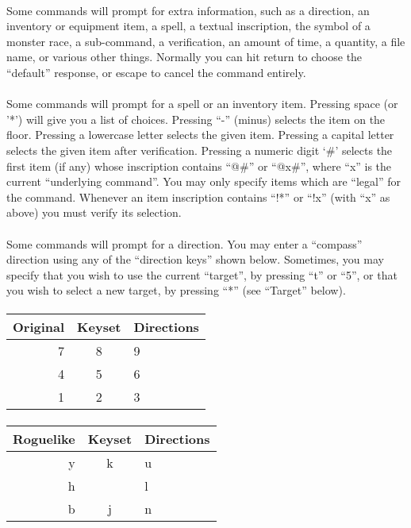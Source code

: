 \paragraph{}Some commands will prompt for extra information, such as a direction, an
inventory or equipment item, a spell, a textual inscription, the symbol of a
monster race, a sub-command, a verification, an amount of time, a quantity,
a file name, or various other things. Normally you can hit return to choose
the ``default'' response, or escape to cancel the command entirely.

\paragraph{}Some commands will prompt for a spell or an inventory item. Pressing
space (or '*') will give you a list of choices. Pressing ``-'' (minus) selects
the item on the floor. Pressing a lowercase letter selects the given item.
Pressing a capital letter selects the given item after verification. Pressing
a numeric digit `\#' selects the first item (if any) whose inscription contains
``@\#'' or ``@x\#'', where ``x'' is the current ``underlying command''. You may only
specify items which are ``legal'' for the command. Whenever an item inscription
contains ``!*'' or ``!x'' (with ``x'' as above) you must verify its selection.

\paragraph{}Some commands will prompt for a direction. You may enter a
``compass'' direction using any of the ``direction keys'' shown below.
Sometimes, you may specify that you wish to use the current ``target'',
by pressing ``t'' or ``5'', or that you wish to select a new target, by
pressing ``*'' (see ``Target'' below).

\paragraph{}
\begin{tabular}{rcl}
   Original & Keyset & Directions \\
\hline
7 & 8 & 9\\
4 & 5 & 6\\
1 & 2 & 3\\
\end{tabular}

\paragraph{}
\begin{tabular}{rcl}
    Roguelike & Keyset & Directions \\
    \hline
      y & k & u \\
      h &   & l \\
      b & j & n \\
\end{tabular}

